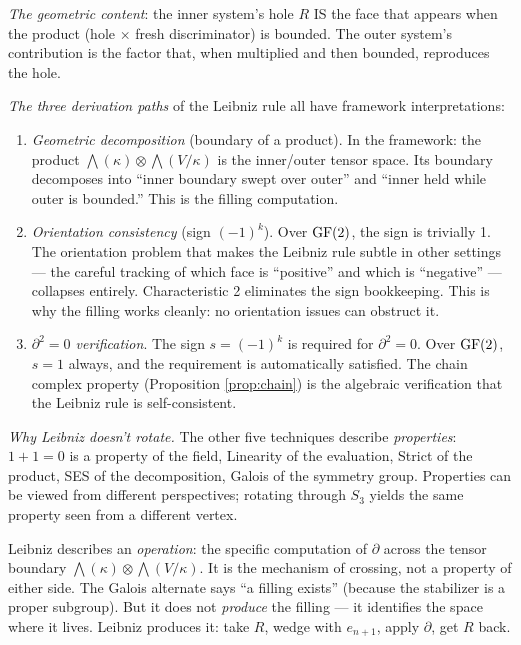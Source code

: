 \emph{The geometric content}: the inner system's hole
$R$ IS the face that appears when the product
(hole $\times$ fresh discriminator) is bounded. The
outer system's contribution is the factor that, when
multiplied and then bounded, reproduces the hole.

\emph{The three derivation paths} of the Leibniz rule
all have framework interpretations:

\begin{enumerate}[nosep]
  \item \emph{Geometric decomposition} (boundary of a
    product). In the framework: the product
    $\bigwedge(\kappa) \otimes \bigwedge(V/\kappa)$ is
    the inner/outer tensor space. Its boundary
    decomposes into ``inner boundary swept over outer''
    and ``inner held while outer is bounded.'' This is
    the filling computation.

  \item \emph{Orientation consistency} (sign $(-1)^k$).
    Over $\operatorname{GF}(2)$, the sign is trivially 1. The
    orientation problem that makes the Leibniz rule
    subtle in other settings --- the careful tracking of
    which face is ``positive'' and which is ``negative''
    --- collapses entirely. Characteristic 2 eliminates
    the sign bookkeeping. This is why the filling works
    cleanly: no orientation issues can obstruct it.

  \item \emph{$\partial^2 = 0$ verification}. The sign
    $s = (-1)^k$ is required for $\partial^2 = 0$.
    Over $\operatorname{GF}(2)$, $s = 1$ always, and the requirement
    is automatically satisfied. The chain complex
    property (Proposition \ref{prop:chain}) is the
    algebraic verification that the Leibniz rule is
    self-consistent.
\end{enumerate}

\emph{Why Leibniz doesn't rotate.}
The other five techniques describe \emph{properties}:
$1{+}1{=}0$ is a property of the field, Linearity of
the evaluation, Strict of the product, SES of the
decomposition, Galois of the symmetry group. Properties
can be viewed from different perspectives; rotating
through $S_3$ yields the same property seen from a
different vertex.

Leibniz describes an \emph{operation}: the specific
computation of $\partial$ across the tensor boundary
$\bigwedge(\kappa) \otimes \bigwedge(V/\kappa)$. It is
the mechanism of crossing, not a property of either
side. The Galois alternate says ``a filling exists''
(because the stabilizer is a proper subgroup). But it
does not \emph{produce} the filling --- it identifies
the space where it lives. Leibniz produces it: take $R$,
wedge with $e_{n+1}$, apply $\partial$, get $R$ back.

